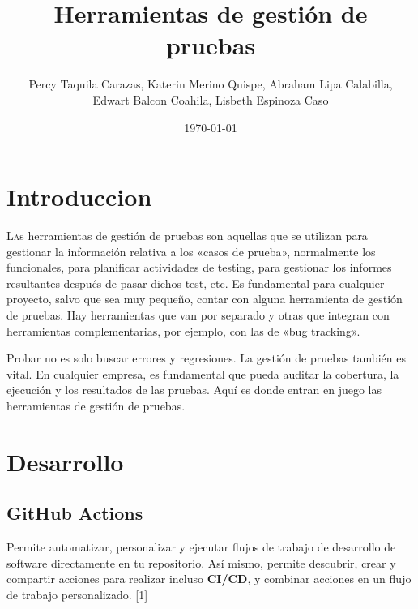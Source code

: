 \documentclass[twoside,twocolumn]{article}
\title{Herramientas de gestión de pruebas}
\author{Percy Taquila Carazas, Katerin Merino Quispe, Abraham Lipa Calabilla,
\\Edwart Balcon Coahila, Lisbeth Espinoza Caso}
\date{\today}
\begin{document}
\maketitle


\section{Introduccion}

\lettrine[nindent=0em,lines=3]{L}as herramientas de gestión de pruebas son aquellas que se utilizan para gestionar la información relativa a los «casos de prueba», normalmente los funcionales, para planificar actividades de testing, para gestionar los informes resultantes después de pasar dichos test, etc.
Es fundamental para cualquier proyecto, salvo que sea muy pequeño, contar con alguna herramienta de gestión de pruebas. Hay herramientas que van por separado y otras que integran con herramientas complementarias, por ejemplo, con las de «bug tracking».

Probar no es solo buscar errores y regresiones. La gestión de pruebas también es vital. En cualquier empresa, es fundamental que pueda auditar la cobertura, la ejecución y los resultados de las pruebas. Aquí es donde entran en juego las herramientas de gestión de pruebas.



\section{Desarrollo}

\subsection{GitHub Actions}

Permite automatizar, personalizar y ejecutar flujos de trabajo de desarrollo de software directamente en tu repositorio. Así mismo, permite descubrir, crear y compartir acciones para realizar incluso \textbf{CI/CD}, y combinar acciones en un flujo de trabajo personalizado. [1]
\end{document}
